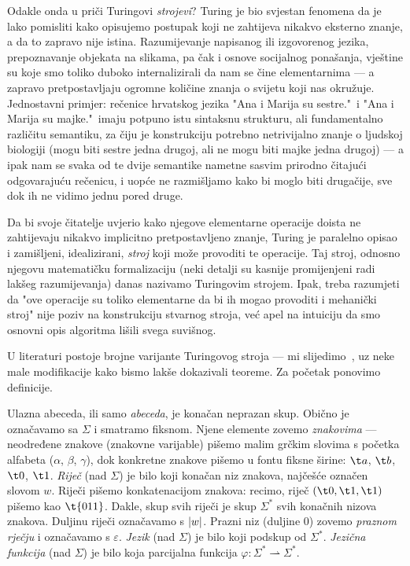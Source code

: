 Odakle onda u priči Turingovi \emph{strojevi}? Turing je bio svjestan fenomena da je lako pomisliti kako opisujemo postupak koji ne zahtijeva nikakvo eksterno znanje, a da to zapravo nije istina. Razumijevanje napisanog ili izgovorenog jezika, prepoznavanje objekata na slikama, pa čak i osnove socijalnog ponašanja, vještine su koje smo toliko duboko internalizirali da nam se čine elementarnima --- a zapravo pretpostavljaju ogromne količine znanja o svijetu koji nas okružuje. Jednostavni primjer: rečenice hrvatskog jezika "Ana i Marija su sestre."\ i "Ana i Marija su majke."\ imaju potpuno istu sintaksnu strukturu, ali fundamentalno različitu semantiku, za čiju je konstrukciju potrebno netrivijalno znanje o ljudskoj biologiji (mogu biti sestre jedna drugoj, ali ne mogu biti majke jedna drugoj) --- a ipak nam se svaka od te dvije semantike nametne sasvim prirodno čitajući odgovarajuću rečenicu, i uopće ne razmišljamo kako bi moglo biti drugačije, sve dok ih ne vidimo jednu pored druge.

Da bi svoje čitatelje uvjerio kako njegove elementarne operacije doista ne zahtijevaju nikakvo implicitno pretpostavljeno znanje, Turing je paralelno opisao i zamišljeni, idealizirani, \emph{stroj} koji može provoditi te operacije. Taj stroj, odnosno njegovu matematičku formalizaciju (neki detalji su kasnije promijenjeni radi lakšeg razumijevanja) danas nazivamo Turingovim strojem. Ipak, treba razumjeti da "ove operacije su toliko elementarne da bi ih mogao provoditi i mehanički stroj" nije poziv na konstrukciju stvarnog stroja, već apel na intuiciju da smo osnovni opis algoritma lišili svega suvišnog.

U literaturi postoje brojne varijante Turingovog stroja --- mi slijedimo~\cite{sipser}, uz neke male modifikacije kako bismo lakše dokazivali teoreme. Za početak ponovimo definicije.

Ulazna abeceda, ili samo \emph{abeceda}, je konačan neprazan skup. Obično je označavamo sa $\Sigma$ i smatramo fiksnom. Njene elemente zovemo \emph{znakovima} --- ne\-od\-re\-đe\-ne znakove (znakovne varijable) pišemo malim grčkim slovima s početka alfabeta ($\alpha$, $\beta$, $\gamma$), dok konkretne znakove pišemo u fontu fiksne širine: $\t a$, $\t b$, $\t 0$, $\t 1$. \emph{Riječ} (nad $\Sigma$) je bilo koji konačan niz znakova, najčešće označen slovom $w$. Riječi pišemo konkatenacijom znakova: recimo, riječ $(\t0,\t1,\t1)$ pišemo kao $\t{011}$. Dakle, skup svih riječi je skup $\Sigma^*$ svih konačnih nizova znakova. Duljinu riječi označavamo s $\lvert w\rvert$. Prazni niz (duljine $0$) zovemo \emph{praznom rječju} i označavamo s $\varepsilon$. \emph{Jezik} (nad $\Sigma$) je bilo koji podskup od $\Sigma^*$. \emph{Jezična funkcija} (nad $\Sigma$) je bilo koja parcijalna funkcija $\varphi:\Sigma^*\rightharpoonup\Sigma^*$.

